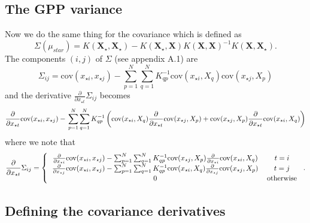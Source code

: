 \documentclass[phd,tocprelim]{cornell}
\begin{document}
\subsection{The GPP variance}

Now we do the same thing for the covariance which is defined as
\begin{equation}
 \Sigma(\mu_{star}) = K(\textbf{X$_{\star}$}, \textbf{X$_{\star}$}) - K(\textbf{X$_{\star}$}, \textbf{X}) K(\textbf{X}, \textbf{X})^{-1} K(\textbf{X}, \textbf{X$_{\star}$}).
\end{equation}
The components $(i,j)$ of $\Sigma$ (see appendix A.1) are
\begin{equation}
 \Sigma_{ij} = \mbox{cov}(x_{\star i}, x_{\star j}) - \sum_{p = 1}^{N} \sum_{q = 1}^{N} K^{-1}_{qp} \mbox{cov}(x_{\star i}, X_{q}) \mbox{cov}(x_{\star j}, X_{p})
\end{equation}
and the derivative $\frac{\partial}{\partial x_{\star t}} \Sigma_{ij}$ becomes
\begin{equation}
 \frac{\partial}{\partial x_{\star t}} \mbox{cov}(x_{\star i}, x_{\star j}) - \\
 \sum_{p = 1}^{N} \sum_{q = 1}^{N} K^{-1}_{qp} \left( \mbox{cov}(x_{\star i}, X_{q}) \frac{\partial}{\partial x_{\star t}} \mbox{cov}(x_{\star j}, X_{p}) + \mbox{cov}(x_{\star j}, X_{p}) \frac{\partial}{\partial x_{\star t}} \mbox{cov}(x_{\star i}, X_{q}) \right)
\end{equation}
where we note that
\begin{equation}
  \frac{\partial}{\partial x_{\star t}} \Sigma_{ij} = \left\{ \begin{tabular}{cc}
                                                       $\frac{\partial}{\partial x_{\star i}} \mbox{cov}(x_{\star i}, x_{\star j}) - \sum_{p = 1}^{N} \sum_{q = 1}^{N} K^{-1}_{qp} \mbox{cov}(x_{\star j}, X_{p}) \frac{\partial}{\partial x_{\star i}} \mbox{cov}(x_{\star i}, X_{q})$ & $t = i$ \\
							$\frac{\partial}{\partial x_{\star j}} \mbox{cov}(x_{\star i}, x_{\star j}) - \sum_{p = 1}^{N} \sum_{q = 1}^{N} K^{-1}_{qp} \mbox{cov}(x_{\star i}, X_{q}) \frac{\partial}{\partial x_{\star j}} \mbox{cov}(x_{\star j}, X_{p})$ & $t = j$ \\
							$0$ & otherwise
                                                      \end{tabular} \right..
\end{equation}

\subsection{Defining the covariance derivatives}
\end{document}
